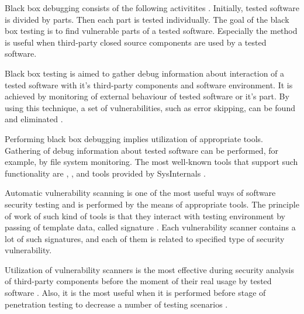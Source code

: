 

%
Black box debugging consists of the following activitites .
%
Initially, tested software is divided by parts. 
%
Then each part is tested individually. 
%
The goal of the black box testing is to find vulnerable parts of a tested software. 
%
Especially the method is useful when third-party closed source components are used by a tested software. 

%
Black box testing is aimed to gather debug information about interaction of a tested software with it's third-party components and software environment. 
%
It is achieved by monitoring of external behaviour of tested software or it's part. 
%
By using this technique, a set of vulnerabilities, such as error skipping, can be found and eliminated . 

%
Performing black box debugging implies utilization of appropriate tools. 
%
Gathering of debug information about tested software can be performed, for example, by file system monitoring. 
%
The most well-known tools that support such functionality are  ,  , and tools provided by SysInternals . 



Automatic vulnerability scanning is one of the most useful ways of software security testing and is performed by the means of appropriate tools. 
%
The principle of work of such kind of tools is that they interact with testing environment by passing of template data, called signature . 
%
Each vulnerability scanner contains a lot of such signatures, and each of them is related to specified type of security vulnerability. 

%
Utilization of vulnerability scanners is the most effective during security analysis of third-party components before the moment of their real usage by tested software . 
%
Also, it is the most useful when it is performed before stage of penetration testing to decrease a number of testing scenarios . 

